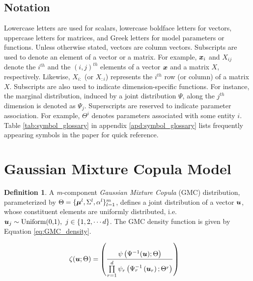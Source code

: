 \documentclass{article}
\theoremstyle{plain}
\theoremstyle{definition}
\newtheorem{definition}[theorem]{Definition}
\theoremstyle{remark}
\begin{document}
\subsection{Notation}\label{subsec:Notation}
Lowercase letters are used for scalars, lowercase boldface letters for vectors, uppercase letters for matrices, and Greek letters for model parameters or functions. Unless otherwise stated, vectors are column vectors. Subscripts are used to denote an element of a vector or a matrix. For example, $\boldsymbol{x}_i$ and $X_{ij}$ denote the $i^{th}$ and the $(i,j)^{th}$ elements of a vector $\boldsymbol{x}$ and a matrix $X$, respectively. Likewise, $X_{i:}$ (or $X_{:i}$) represents the $i^{th}$ row (or column) of a matrix $X$. Subscripts are also used to indicate dimension-specific functions. For instance, the marginal distribution, induced by a joint distribution $\Psi$, along the $j^{th}$ dimension is denoted as $\Psi_j$.  Superscripts are reserved to indicate parameter association. For example, $\Theta^i$ denotes parameters associated with some entity $i$. Table \ref{tab:symbol_glossary} in appendix \ref{apd:symbol_glossary} lists frequently appearing symbols in the paper for quick reference.

\section{Gaussian Mixture Copula Model}\label{sec:GMC_description}
\begin{definition} \label{def:GMC}
 A \emph{m}-component \emph{Gaussian Mixture Copula} (GMC) distribution, parameterized by $\Theta = \{\boldsymbol{\mu}^l, \Sigma^l, \alpha^l\}_{l=1}^m$, defines a joint distribution of a vector $\boldsymbol{u}$, whose constituent elements are uniformly distributed, i.e. $ \boldsymbol{u}_j \sim \text{Uniform(0,1)}, \  j\in \{1,2,\cdots d\}$. The GMC density function is given by Equation \eqref{eq:GMC_density}.
\end{definition}

\begin{align}\label{eq:GMC_density}
\zeta(\boldsymbol{u};\Theta) & = \left( \frac{\psi\left(\Psi^{-1}(\boldsymbol{u});\Theta\right)}{\prod\limits_{r=1}^{d}\psi_{r}\left(\Psi^{-1}_{r} \left( \boldsymbol{u}_r{} \right);\Theta^r \right)} \right)
\end{align}
\end{document}
